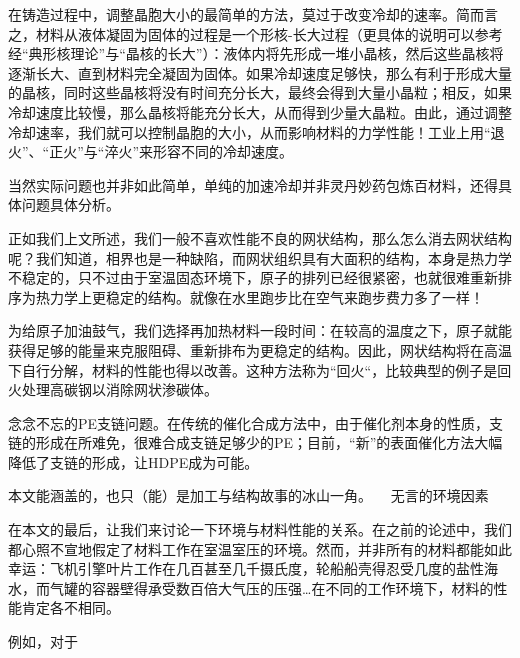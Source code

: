 在铸造过程中，调整晶胞大小的最简单的方法，莫过于改变冷却的速率。简而言之，材料从液体凝固为固体的过程是一个形核-长大过程（更具体的说明可以参考经“典形核理论”与“晶核的长大”）：液体内将先形成一堆小晶核，然后这些晶核将逐渐长大、直到材料完全凝固为固体。如果冷却速度足够快，那么有利于形成大量的晶核，同时这些晶核将没有时间充分长大，最终会得到大量小晶粒；相反，如果冷却速度比较慢，那么晶核将能充分长大，从而得到少量大晶粒。由此，通过调整冷却速率，我们就可以控制晶胞的大小，从而影响材料的力学性能！工业上用“退火”、“正火”与“淬火”来形容不同的冷却速度。

当然实际问题也并非如此简单，单纯的加速冷却并非灵丹妙药包炼百材料，还得具体问题具体分析。

正如我们上文所述，我们一般不喜欢性能不良的网状结构，那么怎么消去网状结构呢？我们知道，相界也是一种缺陷，而网状组织具有大面积的结构，本身是热力学不稳定的，只不过由于室温固态环境下，原子的排列已经很紧密，也就很难重新排序为热力学上更稳定的结构。就像在水里跑步比在空气来跑步费力多了一样！

为给原子加油鼓气，我们选择再加热材料一段时间：在较高的温度之下，原子就能获得足够的能量来克服阻碍、重新排布为更稳定的结构。因此，网状结构将在高温下自行分解，材料的性能也得以改善。这种方法称为“回火“，比较典型的例子是回火处理高碳钢以消除网状渗碳体。

念念不忘的PE支链问题。在传统的催化合成方法中，由于催化剂本身的性质，支链的形成在所难免，很难合成支链足够少的PE；目前，“新”的表面催化方法大幅降低了支链的形成，让HDPE成为可能。

本文能涵盖的，也只（能）是加工与结构故事的冰山一角。 
无言的环境因素

在本文的最后，让我们来讨论一下环境与材料性能的关系。在之前的论述中，我们都心照不宣地假定了材料工作在室温室压的环境。然而，并非所有的材料都能如此幸运：飞机引擎叶片工作在几百甚至几千摄氏度，轮船船壳得忍受几度的盐性海水，而气罐的容器壁得承受数百倍大气压的压强…在不同的工作环境下，材料的性能肯定各不相同。

例如，对于

